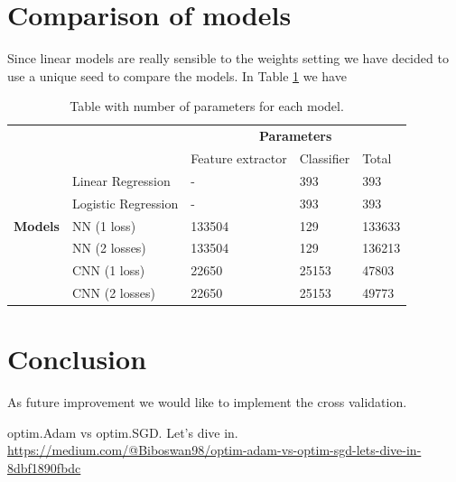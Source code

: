 \documentclass[journal, a4paper]{IEEEtran}
\begin{document}
\section{Comparison of models}
\label{sec:comparison}
Since linear models are really sensible to the weights setting 
we have decided to use a unique seed to compare the models.
In Table \ref{table:params} we have %


\begin{table}
\centering
\caption{Table with number of parameters for each model.}
\label{table:params}
\begin{tabular}{|l|l|l|l|l|} 
\cline{3-5}
\multicolumn{1}{l}{} &                     & \multicolumn{3}{c|}{\textbf{Parameters}}          \\ 
\cline{3-5}
\multicolumn{1}{l}{} &                     & Feature extractor & Classifier & Total   \\ 
\hline
                     & Linear Regression   & -                 & 393        & 393     \\ 
\cline{2-5}
               & Logistic Regression & -                 & 393        & 393     \\ 
\cline{2-5}
 \textbf{Models}   & NN (1 loss)~        & 133504            & 129        & 133633  \\ 
\cline{2-5}
                     & NN (2 losses)~      & 133504            & 129        & 136213  \\ 
\cline{2-5}
                     & CNN (1 loss)~       & 22650             & 25153      & 47803   \\ 
\cline{2-5}
                     & CNN (2 losses)      & 22650             & 25153      & 49773   \\
\hline
\end{tabular}
\end{table}

\section{Conclusion}
\label{sec:conclusion}
As future improvement we would like to implement the cross validation.



\begin{thebibliography}{999}

    	optim.Adam vs optim.SGD. Let’s dive in.
    	\url{https://medium.com/@Biboswan98/optim-adam-vs-optim-sgd-lets-dive-in-8dbf1890fbdc}
	
	    

\end{thebibliography}

\end{document}
